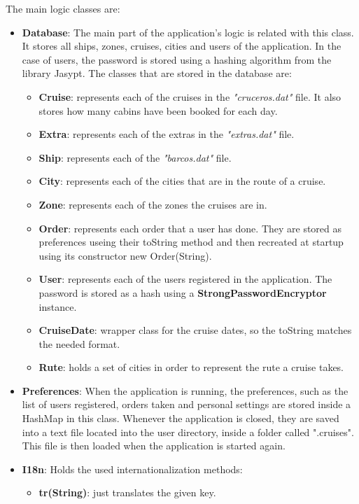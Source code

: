 \documentclass[11pt]{article}
\begin{document}
	The main logic classes are:
	\begin{itemize}
		\item \textbf{Database}: The main part of the application's logic is related with this class. It stores all ships, zones, cruises, cities and users of the application. In the case of users, the password is stored using a hashing algorithm from the library Jasypt. The classes that are stored in the database are:
		\begin{itemize}
			\item \textbf{Cruise}: represents each of the cruises in the \textit{"cruceros.dat"} file. It also stores how many cabins have been booked for each day.
			\item \textbf{Extra}: represents each of the extras in the \textit{"extras.dat"} file.
			\item \textbf{Ship}: represents each of the \textit{"barcos.dat"} file.
			\item \textbf{City}: represents each of the cities that are in the route of a cruise.
			\item \textbf{Zone}: represents each of the zones the cruises are in.
			\item \textbf{Order}: represents each order that a user has done. They are stored as preferences useing their toString method and then recreated at startup using its constructor new Order(String).
			\item \textbf{User}: represents each of the users registered in the application. The password is stored as a hash using a \textbf{StrongPasswordEncryptor} instance.
			\item \textbf{CruiseDate}: wrapper class for the cruise dates, so the toString matches the needed format.
			\item \textbf{Rute}: holds a set of cities in order to represent the rute a cruise takes.
		\end{itemize}
		\item \textbf{Preferences}: When the application is running, the preferences, such as the list of users registered, orders taken and personal settings are stored inside a HashMap in this class. Whenever the application is closed, they are saved into a text file located into the user directory, inside a folder called ".cruises". This file is then loaded when the application is started again.
		\item \textbf{I18n}: Holds the used internationalization methods:
		\begin{itemize}
			\item \textbf{tr(String)}: just translates the given key.

\end{itemize}
\end{itemize}
\end{document}
